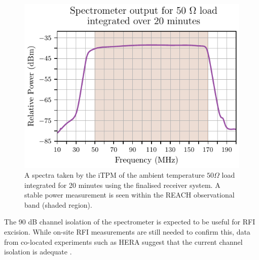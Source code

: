 \begin{figure}
    \centering
    \includegraphics{psd_cold}
    \caption{A spectra taken by the iTPM of the ambient temperature $50 \Omega$ load integrated for 20 minutes using the finalised receiver system. A stable power measurement is seen within the REACH observational band (shaded region).}
    \label{fig:psd_cold}
\end{figure}
The 90 dB channel isolation of the spectrometer is expected to be useful for RFI excision. While on-site RFI measurements are still needed to confirm this, data from co-located experiments such as HERA suggest that the current channel isolation is adequate \citep{hera}.



